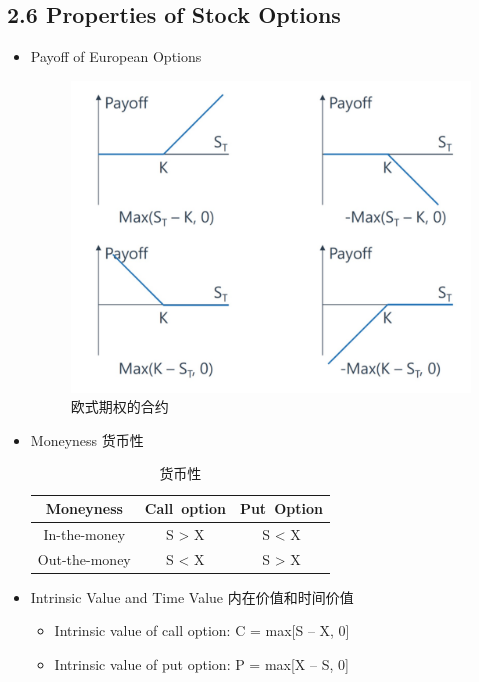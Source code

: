 \documentclass[a4paper,6pt,twoside,openany]{article}
\begin{document}
\subsection*{2.6 Properties of Stock Options}
\begin{itemize}
\item Payoff of European Options
  \begin{figure}[!htbp]
    \centering \includegraphics[width=150mm]{figures/Options_Payoff.jpg}
    \caption{欧式期权的合约}
  \end{figure}
\item Moneyness 货币性
  \begin{table}[!htb]
    \renewcommand\arraystretch{1.5}
    \caption{货币性}
    \centering
    \begin{tabular}{|c|c|c|} \hline
      \rowcolor[gray]{0.5}
     Moneyness & Call\ option &  Put\ Option\\ \hline
     In-the-money & S > X & S < X \\ \hline
     Out-the-money & S < X &  S > X \\ \hline 
    \end{tabular}
  \end{table}
\item Intrinsic Value and Time Value 内在价值和时间价值
  \begin{itemize}
  \item Intrinsic value of call option: C = max[S – X, 0]
  \item Intrinsic value of put option: P = max[X – S, 0]
  \end{itemize}

\end{itemize}
\end{document}
